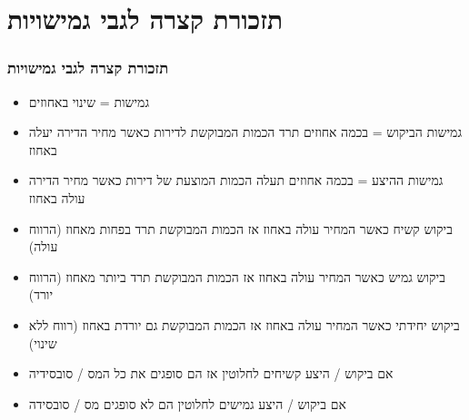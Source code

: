 \documentclass[usenames,dvipsnames, 10pt]{beamer}
\begin{document}
\begin{RTL}
\begin{frame}
\end{frame}




\section{תזכורת קצרה לגבי גמישויות}
\begin{frame}[allowframebreaks]
    \frametitle{תזכורת קצרה לגבי גמישויות}
    \begin{itemize}
        \item גמישות = שינוי באחוזים
        \item גמישות הביקוש = בכמה אחוזים תרד הכמות המבוקשת לדירות כאשר מחיר הדירה יעלה באחוז
        \item גמישות ההיצע = בכמה אחוזים תעלה הכמות המוצעת של דירות כאשר מחיר הדירה עולה באחוז
        \item ביקוש קשיח כאשר המחיר עולה באחוז אז הכמות המבוקשת תרד בפחות מאחוז (הרווח עולה)
        \item ביקוש גמיש כאשר המחיר עולה באחוז אז הכמות המבוקשת תרד ביותר מאחוז (הרווח יורד)
        \item ביקוש יחידתי כאשר המחיר עולה באחוז אז הכמות המבוקשת גם יורדת באחוז (רווח ללא שינוי)
        \item אם ביקוש / היצע קשיחים לחלוטין אז הם סופגים את כל המס / סובסידיה
        \item אם ביקוש / היצע גמישים לחלוטין הם לא סופגים מס / סובסידה 


    \end{itemize}
    

\end{frame}
\end{RTL}
\end{document}
